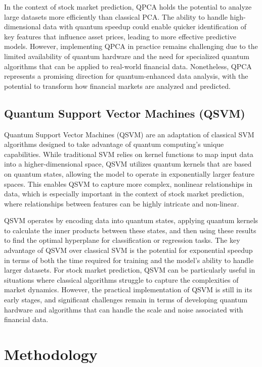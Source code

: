 \documentclass[journal]{IEEEtran}
\begin{document}
In the context of stock market prediction, QPCA holds the potential to analyze large datasets more efficiently than classical PCA. The ability to handle high-dimensional data with quantum speedup could enable quicker identification of key features that influence asset prices, leading to more effective predictive models. However, implementing QPCA in practice remains challenging due to the limited availability of quantum hardware and the need for specialized quantum algorithms that can be applied to real-world financial data. Nonetheless, QPCA represents a promising direction for quantum-enhanced data analysis, with the potential to transform how financial markets are analyzed and predicted.

\subsection{Quantum Support Vector Machines (QSVM)}
Quantum Support Vector Machines (QSVM) are an adaptation of classical SVM algorithms designed to take advantage of quantum computing's unique capabilities. While traditional SVM relies on kernel functions to map input data into a higher-dimensional space, QSVM utilizes quantum kernels that are based on quantum states, allowing the model to operate in exponentially larger feature spaces. This enables QSVM to capture more complex, nonlinear relationships in data, which is especially important in the context of stock market prediction, where relationships between features can be highly intricate and non-linear.

QSVM operates by encoding data into quantum states, applying quantum kernels to calculate the inner products between these states, and then using these results to find the optimal hyperplane for classification or regression tasks. The key advantage of QSVM over classical SVM is the potential for exponential speedup in terms of both the time required for training and the model's ability to handle larger datasets. For stock market prediction, QSVM can be particularly useful in situations where classical algorithms struggle to capture the complexities of market dynamics. However, the practical implementation of QSVM is still in its early stages, and significant challenges remain in terms of developing quantum hardware and algorithms that can handle the scale and noise associated with financial data.

\section{Methodology}
\end{document}
